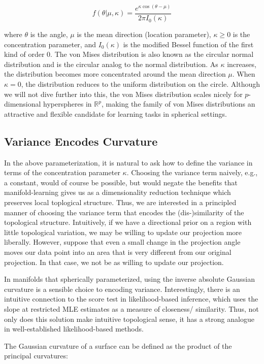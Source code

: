 \documentclass[twoside,11pt]{article}
\begin{document}
$$
f(\theta|\mu,\kappa) = \frac{e^{\kappa \cos(\theta-\mu)}}{2\pi I_0(\kappa)}
$$

where $\theta$ is the angle, $\mu$ is the mean direction (location parameter), $\kappa \geq 0$ is the concentration parameter, and $I_0(\kappa)$ is the modified Bessel function of the first kind of order 0. The von Mises distribution is also known as the circular normal distribution and is the circular analog to the normal distribution. As $\kappa$ increases, the distribution becomes more concentrated around the mean direction $\mu$. When $\kappa = 0$, the distribution reduces to the uniform distribution on the circle. Although we will not dive further into this, the von Mises distribution scales nicely for $p$-dimensional hyperspheres in $\mathbb{R}^p$, making the family of von Mises distributions an attractive and flexible candidate for learning tasks in spherical settings. 

\subsection{Variance Encodes Curvature}

In the above parameterization, it is natural to ask how to define the variance in terms of the concentration parameter $\kappa$. Choosing the variance term naively, e.g., a constant, would of course be possible, but would negate the benefits that manifold-learning gives us as a dimensionality reduction technique which preserves local toplogical structure. Thus, we are interested in a principled manner of choosing the variance term that encodes the (dis-)similarity of the topological structure. Intuitively, if we have a directional prior on a region with little topological variation, we may be willing to update our projection more liberally. However, suppose that even a small change in the projection angle moves our data point into an area that is very different from our original projection. In that case, we not be as willing to update our projection. 

In manifolds that spherically parameterized, using the inverse absolute Gaussian curvature is a sensible choice to encoding variance. Interestingly, there is an intuitive connection to the score test in likelihood-based inference, which uses the slope at restricted MLE estimates as a measure of closeness/ similarity. Thus, not only does this solution make intuitive topological sense, it has a strong analogue in well-established likelihood-based methods.  

The Gaussian curvature of a surface can be defined as the product of the principal curvatures:
\end{document}
